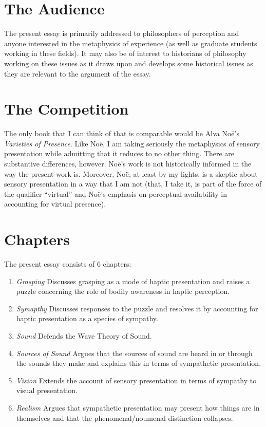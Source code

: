 \documentclass[12pt]{article}
\begin{document}
\section{The Audience} %
\label{sec:the_audience}

The present essay is primarily addressed to philosophers of perception and anyone interested in the metaphysics of experience (as well as graduate students working in these fields). It may also be of interest to historians of philosophy working on these issues as it draws upon and develops some historical issues as they are relevant to the argument of the essay.


\section{The Competition} %
\label{sec:the_competition}

The only book that I can think of that is comparable would be Alva No\"{e}'s \emph{Varieties of Presence}. Like No\"{e}, I am taking seriously the metaphysics of sensory presentation while admitting that it reduces to no other thing. There are substantive differences, however. No\"{e}'s work is not historically informed in the way the present work is. Moreover, No\"{e}, at least by my lights, is a skeptic about sensory presentation in a way that I am not (that, I take it, is part of the force of the qualifier ``virtual'' and No\"{e}'s emphasis on perceptual availability in accounting for virtual presence).


\section{Chapters} %
\label{sec:chapters}

The present essay consists of 6 chapters:

\begin{enumerate}
	\item \emph{Grasping} Discusses grasping as a mode of haptic presentation and raises a puzzle concerning the role of bodily awareness in haptic perception.
	\item \emph{Symapthy} Discusses responses to the puzzle and resolves it by accounting for haptic presentation as a species of sympathy.
	\item \emph{Sound} Defends the Wave Theory of Sound.
	\item \emph{Sources of Sound} Argues that the sources of sound are heard in or through the sounds they make and explains this in terms of sympathetic presentation.
	\item \emph{Vision} Extends the account of sensory presentation in terms of sympathy to visual presentation.
	\item \emph{Realism} Argues that sympathetic presentation may present how things are in themselves and that the phenomenal/noumenal distinction collapses.
\end{enumerate}
\end{document}
